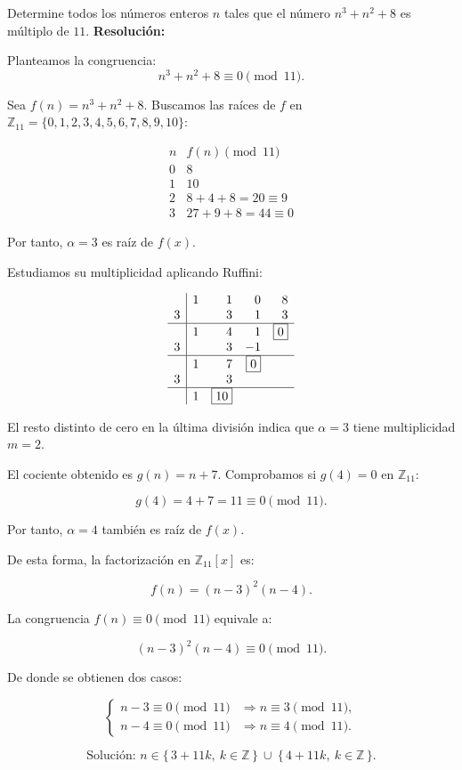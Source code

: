 \documentclass[a4paper,12pt]{article}
\begin{document}
\begin{ejercicio}[title=Ejercicio 49]
Determine todos los números enteros \(n\) tales que el número \(n^3 + n^2 + 8\) es múltiplo de \(11\).
\tcblower
\textbf{Resolución:}

Planteamos la congruencia:
\[
n^3 + n^2 + 8 \equiv 0 \pmod{11}.
\]

Sea \(f(n) = n^3 + n^2 + 8\).  
Buscamos las raíces de \(f\) en \(\mathbb{Z}_{11} = \{0,1,2,3,4,5,6,7,8,9,10\}\):

\[
\begin{array}{c|c}
n & f(n)\pmod{11} \\ \hline
0 & 8 \\
1 & 10 \\
2 & 8 + 4 + 8 = 20 \equiv 9 \\
3 & 27 + 9 + 8 = 44 \equiv 0
\end{array}
\]

Por tanto, \(\alpha = 3\) es raíz de \(f(x)\).

\vspace{0.5em}
Estudiamos su multiplicidad aplicando Ruffini:

\[
\begin{array}{r|rrrr}
  & 1 & 1 & 0 & 8 \\
3 &   & 3 & 1 & 3 \\
\hline
  & 1 & 4 & 1 & \boxed{0} \\
3 &   & 3 & -1 \\
\hline
  & 1 & 7 & \boxed{0} \\
3 &   & 3 \\
\hline
  & 1 & \boxed{10}
\end{array}
\]

El resto distinto de cero en la última división indica que \(\alpha = 3\) tiene multiplicidad \(m = 2\).

\vspace{0.5em}
El cociente obtenido es \(g(n) = n + 7\).  
Comprobamos si \(g(4) = 0\) en \(\mathbb{Z}_{11}\):

\[
g(4) = 4 + 7 = 11 \equiv 0 \pmod{11}.
\]

Por tanto, \(\alpha = 4\) también es raíz de \(f(x)\).

\vspace{0.5em}
De esta forma, la factorización en \(\mathbb{Z}_{11}[x]\) es:

\[
f(n) = (n - 3)^2 (n - 4).
\]

La congruencia \(f(n) \equiv 0 \pmod{11}\) equivale a:

\[
(n - 3)^2 (n - 4) \equiv 0 \pmod{11}.
\]

De donde se obtienen dos casos:

\[
\begin{cases}
n - 3 \equiv 0 \pmod{11} &\Rightarrow n \equiv 3 \pmod{11},\\
n - 4 \equiv 0 \pmod{11} &\Rightarrow n \equiv 4 \pmod{11}.
\end{cases}
\]

\vspace{0.5em}
\[
\text{Solución: }\boxed{n \in \{\,3 + 11k,\ k \in \mathbb{Z}\,\} \ \cup\ \{\,4 + 11k,\ k \in \mathbb{Z}\,\}.}
\]
\end{ejercicio}
\end{document}

